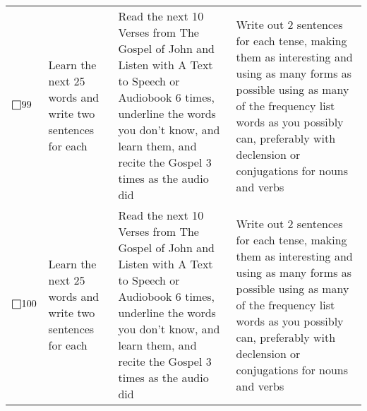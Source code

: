 \documentclass{article}[10pt]
\def\msquare{\mathord{\scalerel*{\Box}{gX}}}
\begin{document}
\begin{longtable}[p]{| p{1cm}| p{6cm}| p{6cm}| p{5cm} |}
$\msquare 99$ & 
Learn the next 25 words and write two sentences for each &
Read the next 10 Verses from The Gospel of John and Listen with A Text to Speech or Audiobook 6 times, underline the words you don't know, and learn them, and recite the Gospel 3 times as the audio did  & 
Write out 2 sentences for each tense, making them as interesting and using as many forms as possible using as many of the frequency list words as you possibly can, preferably with declension or conjugations for nouns and verbs\\

$\msquare 100$ & 
Learn the next 25 words and write two sentences for each &
Read the next 10 Verses from The Gospel of John and Listen with A Text to Speech or Audiobook 6 times, underline the words you don't know, and learn them, and recite the Gospel 3 times as the audio did  & 
Write out 2 sentences for each tense, making them as interesting and using as many forms as possible using as many of the frequency list words as you possibly can, preferably with declension or conjugations for nouns and verbs\\
\end{longtable}
\end{document}
